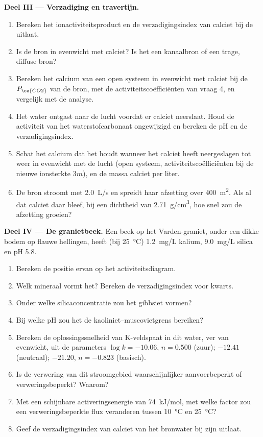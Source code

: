 \begin{problem}
\medskip\noindent\textbf{Deel III --- Verzadiging en travertijn.}
\begin{enumerate}[resume]
\item Bereken het ionactiviteitsproduct en de verzadigingsindex van calciet
  bij de uitlaat.
\item Is de bron in evenwicht met calciet? Is het een kanaalbron of
  een trage, diffuse bron?
\item Bereken het calcium van een open systeem in evenwicht met calciet bij
  de $P_{\ce{CO2}}$ van de bron, met de activiteitscoëfficiënten van vraag 4,
  en vergelijk met de analyse.
\item Het water ontgast naar de lucht voordat er calciet neerslaat. Houd de
  activiteit van het waterstofcarbonaat ongewijzigd en bereken de pH en de verzadigingsindex.
\item Schat het calcium dat het houdt wanneer het calciet heeft neergeslagen tot
  weer in evenwicht met de lucht (open systeem, activiteitscoëfficiënten bij de nieuwe
  ionsterkte $3m$), en de massa calciet per liter.
\item De bron stroomt met \qty{2.0}{L/s} en spreidt haar afzetting over
  \qty{400}{m^2}. Als al dat calciet daar bleef, bij een dichtheid van
  \qty{2.71}{g/cm^3}, hoe snel zou de afzetting groeien?
\end{enumerate}

\medskip\noindent\textbf{Deel IV --- De granietbeek.} Een beek op het
Varden-graniet, onder een dikke bodem op flauwe hellingen, heeft (bij
\qty{25}{\celsius}) \qty{1.2}{mg/L} kalium, \qty{9.0}{mg/L}
silica en pH 5.8.
\begin{enumerate}[resume]
\item Bereken de positie ervan op het activiteitsdiagram.
\item Welk mineraal vormt het? Bereken de verzadigingsindex voor kwarts.
\item Onder welke silicaconcentratie zou het gibbsiet vormen?
\item Bij welke pH zou het de kaoliniet--muscovietgrens bereiken?
\item Bereken de oplossingssnelheid van K-veldspaat in dit water, ver van
  evenwicht, uit de parameters $\log k = -10.06$, $n = 0.500$ (zuur);
  $-12.41$ (neutraal); $-21.20$, $n = -0.823$ (basisch).
\item Is de verwering van dit stroomgebied waarschijnlijker aanvoerbeperkt of
  verweringsbeperkt? Waarom?
\item Met een schijnbare activeringsenergie van \qty{74}{kJ/mol}, met welke factor
  zou een verweringsbeperkte flux veranderen tussen \qty{10}{\celsius} en
  \qty{25}{\celsius}?
\item Geef de verzadigingsindex van calciet van het bronwater bij zijn
  uitlaat.
\end{enumerate}
\end{problem}

